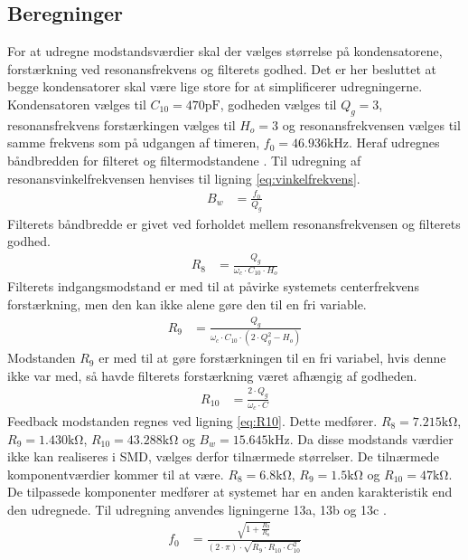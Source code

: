 \subsection{Beregninger}
For at udregne modstandsværdier skal der vælges størrelse på kondensatorene, forstærkning ved resonansfrekvens og filterets godhed.
Det er her besluttet at begge kondensatorer skal være lige store for at simplificerer udregningerne.
Kondensatoren vælges til $C_{10} = 470 \si{\pico\farad}$, godheden vælges til $Q_g = 3$, resonansfrekvens forstærkingen vælges til $H_o = 3$ og resonansfrekvensen vælges til samme frekvens som på udgangen af timeren, $f_0 = 46.936 \si{\kilo\hertz}$.
Heraf udregnes båndbredden for filteret og filtermodstandene \cite[Side. 209]{Huelsman1993}.
Til udregning af resonansvinkelfrekvensen henvises til ligning \ref{eq:vinkelfrekvens}.
\begin{align}
	B_w & = \frac{f_0}{Q_g}
	\end{align}
Filterets båndbredde er givet ved forholdet mellem resonansfrekvensen og filterets godhed.
\begin{align}
	R_8 & = \frac{Q_g}{\omega_c \cdot C_{10} \cdot H_o } \label{eq:R8}
	\end{align}
Filterets indgangsmodstand er med til at påvirke systemets centerfrekvens forstærkning, men den kan ikke alene gøre den til en fri variable. 
\begin{align}
	R_9 & = \frac{Q_g}{ \omega_c \cdot C_{10} \cdot \left( 2 \cdot Q_g^2 - H_o \right) } \label{eq:R9}
	\end{align}
Modstanden $R_9$ er med til at gøre forstærkningen til en fri variabel, hvis denne ikke var med, så havde filterets forstærkning været afhængig af godheden.
\begin{align}
	R_{10} & = \frac{2 \cdot Q_g}{ \omega_c \cdot C} \label{eq:R10}
\end{align}
Feedback modstanden regnes ved ligning \ref{eq:R10}.
Dette medfører. $R_8 = 7.215 \si{\kilo\ohm}$, $R_9 = 1.430 \si{\kilo\ohm}$, $R_{10} = 43.288 \si{\kilo\ohm}$ og $B_w = 15.645 \si{\kilo\hertz}$.
Da disse modstands værdier ikke kan realiseres i SMD, vælges derfor tilnærmede størrelser.
De tilnærmede komponentværdier kommer til at være. $R_8 = 6.8 \si{\kilo\ohm}$, $R_9 = 1.5 \si{\kilo\ohm}$ og $R_{10} = 47 \si{\kilo\ohm}$.
De tilpassede komponenter medfører at systemet har en anden karakteristik end den udregnede. 
Til udregning anvendes ligningerne 13a, 13b og 13c \cite[Side. 208]{Huelsman1993}. 
\begin{align}
	f_0 & = \frac{\sqrt{1+\frac{R_9}{R_8}}}{\left( 2 \cdot \pi \right) \cdot \sqrt{R_9 \cdot R_{10} \cdot C_{10}^2}}
	\end{align}
